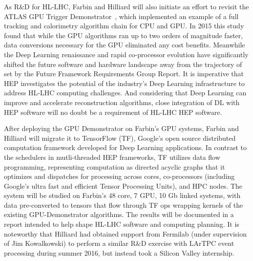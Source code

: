 

As R&D for HL-LHC, Farbin and Hilliard will also initiate an effort to
revisit the ATLAS GPU Trigger Demonstrator~\cite{}, which implemented
an example of a full tracking and calorimetry algorithm chain for CPU
and GPU.  In 2015 this study found that while the GPU algorithms ran
up to two orders of magnitude faster, data conversions necessary for
the GPU eliminated any cost benefits. Meanwhile the Deep Learning
renaissance and rapid co-processor evolution have significantly
shifted the future software and hardware landscape away from the
trajectory of set by the Future Framework Requirements Group
Report. It is imperative that HEP investigates the potential of the
industry's Deep Learning infrastructure to address HL-LHC computing
challenges. And considering that Deep Learning can improve and
accelerate reconstruction algorithms, close integration of DL with HEP
software will no doubt be a requirement of HL-LHC HEP software.

After deploying the GPU Demonstrator on Farbin's GPU systems, Farbin
and Hilliard will migrate it to TensorFlow (TF), Google's open source
distributed computation framework developed for Deep Learning
applications.  In contrast to the schedulers in mutli-threaded HEP
frameworks, TF utilizes data flow programming, representing
computation as directed acyclic graphs that it optimizes and
dispatches for processing across cores, co-processors (including
Google's ultra fast and efficient Tensor Processing Units), and HPC
nodes.  The system will be studied on Farbin's 48 core, 7 GPU, 10 Gb
linked systems, with data pre-converted to tensors that flow through
TF ops wrapping kernels of the existing GPU-Demonstrator
algorithms. The results will be documented in a report intended to
help shape HL-LHC software and computing planning. It is noteworthy
that Hilliard had obtained support from Fermilab (under supervision of
Jim Kowalkowski) to perform a similar R&D exercise with LArTPC event
processing during summer 2016, but instead took a Silicon Valley
internship.



